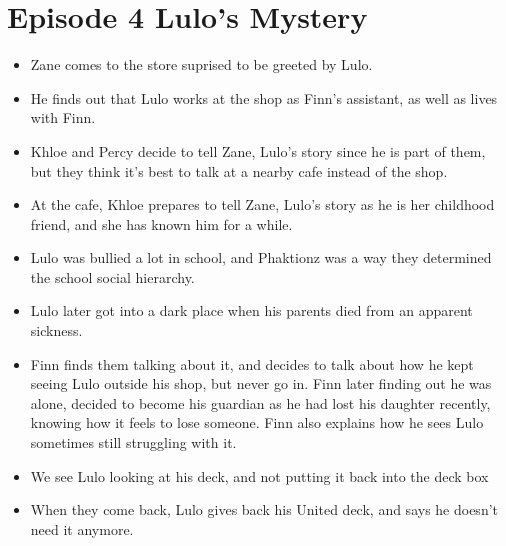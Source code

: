 \documentclass[12pt, letterpaper]{article}
\begin{document}
\section*{Episode 4 Lulo's Mystery}

\begin{itemize}
    \item Zane comes to the store suprised to be greeted by Lulo.
    \item He finds out that Lulo works at the shop as Finn’s assistant, as well as lives with Finn.
    \item Khloe and Percy decide to tell Zane, Lulo’s story since he is part of them, but they think it’s best to talk at a nearby cafe instead of the shop.
    \item At the cafe, Khloe prepares to tell Zane, Lulo’s story as he is her childhood friend, and she has known him for a while.
    \item Lulo was bullied a lot in school, and Phaktionz was a way they determined the school social hierarchy.
    \item Lulo later got into a dark place when his parents died from an apparent sickness.
    \item Finn finds them talking about it, and decides to talk about how he kept seeing Lulo outside his shop, but never go in. Finn later finding out he 
    was alone, decided to become his guardian as he had lost his daughter recently, knowing how it feels to lose someone. Finn also explains how he sees Lulo 
    sometimes still struggling with it.
    \item We see Lulo looking at his deck, and not putting it back into the deck box
    \item When they come back, Lulo gives back his United deck, and says he doesn’t need it anymore.
\end{itemize}
\end{document}
